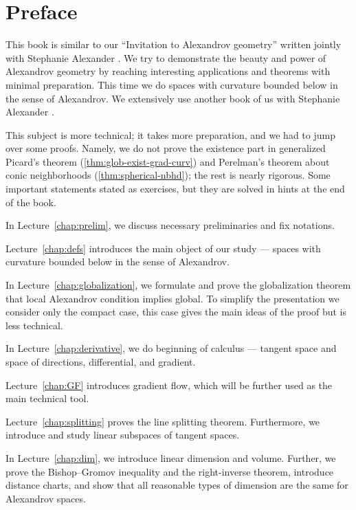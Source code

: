 \chapter*{Preface}

This book is similar to our ``Invitation to Alexandrov geometry'' written jointly with Stephanie Alexander \cite{alexander-kapovitch-petrunin-2019}.
We try to demonstrate the beauty and power of Alexandrov geometry by reaching interesting applications and theorems with minimal preparation.
This time we do spaces with curvature bounded below in the sense of Alexandrov.
We extensively use another book of us with Stephanie Alexander \cite{alexander-kapovitch-petrunin2024}.

This subject is more technical; it takes more preparation, and we had to jump over some proofs.
Namely, we do not prove the existence part in generalized Picard's theorem (\ref{thm:glob-exist-grad-curv})
and Perelman's theorem about conic neighborhoods (\ref{thm:spherical-nbhd});
the rest is nearly rigorous.
Some important statements stated as exercises, but they are solved in hints at the end of the book.

\medskip 

In Lecture~\ref{chap:prelim}, we discuss necessary preliminaries and fix notations.

Lecture~\ref{chap:defs} introduces the main object of our study --- spaces with curvature bounded below in the sense of Alexandrov.

In Lecture~\ref{chap:globalization}, we formulate and prove the globalization theorem that local Alexandrov condition implies global.
To simplify the presentation we consider only the compact case, this case gives the main ideas of the proof but is less technical.

In Lecture~\ref{chap:derivative}, we do beginning of calculus --- tangent space and space of directions, differential, and gradient.

Lecture~\ref{chap:GF} introduces gradient flow, which will be further used as the main technical tool.

Lecture~\ref{chap:splitting} proves the line splitting theorem.
Furthermore, we introduce and study  linear subspaces of tangent spaces.

In Lecture~\ref{chap:dim}, we introduce linear dimension and volume.
Further, we prove the Bishop--Gromov inequality and the right-inverse theorem,
introduce  distance charts, and show that all reasonable types of dimension are the 
same for Alexandrov spaces.

